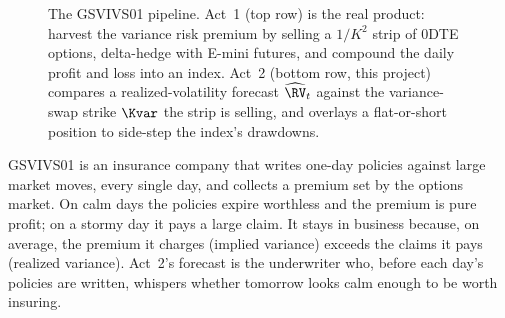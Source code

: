 \begin{figure}[ht]
\centering
{}
\caption{The GSVIVS01 pipeline. Act~1 (top row) is the real product: harvest the variance risk premium by selling a $1/K^2$ strip of 0DTE options, delta-hedge with E-mini futures, and compound the daily profit and loss into an index. Act~2 (bottom row, this project) compares a realized-volatility forecast $\widehat{\RV}_t$ against the variance-swap strike $\Kvar$ the strip is selling, and overlays a flat-or-short position to side-step the index's drawdowns.}
\label{fig:gsvivs:pipeline}
\end{figure}

\begin{intuition}
GSVIVS01 is an insurance company that writes one-day policies against large market moves, every single day, and collects a premium set by the options market. On calm days the policies expire worthless and the premium is pure profit; on a stormy day it pays a large claim. It stays in business because, on average, the premium it charges (implied variance) exceeds the claims it pays (realized variance). Act~2's forecast is the underwriter who, before each day's policies are written, whispers whether tomorrow looks calm enough to be worth insuring.
\end{intuition}

